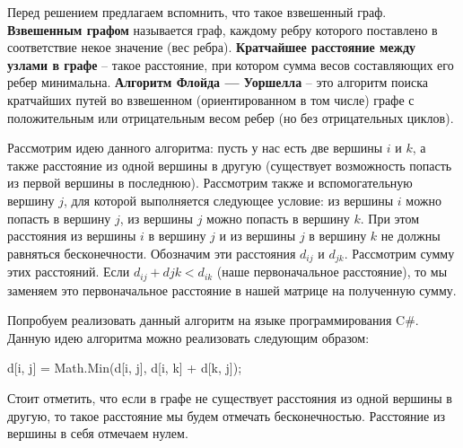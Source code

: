 \documentclass[12pt]{article}
\begin{document}
Перед решением предлагаем вспомнить, что такое взвешенный граф. \textbf{Взвешенным графом} называется граф, каждому ребру которого поставлено в соответствие некое значение (вес ребра).
\textbf{Кратчайшее расстояние между узлами в графе} -- такое расстояние, при котором сумма весов составляющих его ребер минимальна.
\textbf{Алгоритм Флойда — Уоршелла} -- это алгоритм поиска кратчайших путей во взвешенном (ориентированном в том числе) графе с положительным или отрицательным весом ребер (но без отрицательных циклов).

Рассмотрим идею данного алгоритма: пусть у нас есть две вершины $i$ и $k$, а также 
расстояние из одной вершины в другую (существует возможность попасть из
 первой вершины в последнюю). Рассмотрим также и вспомогательную вершину $j$, 
 для которой выполняется следующее условие: из вершины $i$ можно попасть в 
 вершину $j$, из вершины $j$ можно попасть в вершину $k$. При этом расстояния
  из вершины $i$ в вершину $j$ и из вершины $j$ в вершину $k$ не должны равняться
   бесконечности. Обозначим эти расстояния $d_{ij}$ и $d_{jk}$. Рассмотрим сумму
    этих расстояний. Если $d_{ij} + d{jk} < d_{ik}$ (наше первоначальное
     расстояние), то мы заменяем это первоначальное расстояние в нашей матрице 
     на полученную сумму.

Попробуем реализовать данный алгоритм на языке программирования C\#. Данную идею алгоритма можно реализовать следующим образом: 

\begin{center}
d[i, j] = Math.Min(d[i, j], d[i, k] + d[k, j]); 
\end{center}
Стоит отметить, что если в графе не существует расстояния из одной вершины в другую, то такое расстояние мы будем отмечать бесконечностью. Расстояние из вершины в себя отмечаем нулем.
\end{document}
